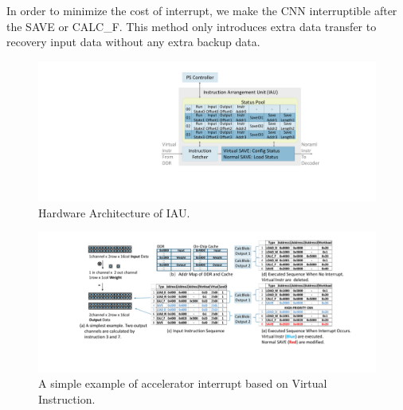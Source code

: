 In order to minimize the cost of interrupt, we make the CNN interruptible after the SAVE or CALC\_F. This method only introduces extra data transfer to recovery input data without any extra backup data.





\begin{figure}[t]
	\centering
    \vspace{-0.1cm} 
    \setlength{\abovecaptionskip}{0cm} 
    \setlength{\belowcaptionskip}{-0.05cm} 
	\includegraphics[width=0.99\linewidth]{fig/iau.pdf}
	\caption{Hardware Architecture of IAU. 
	}
	\label{fig:IAU}
\end{figure}
\begin{figure}[t]
	\centering
    \vspace{-0.1cm} 
    \setlength{\abovecaptionskip}{0cm} 
    \setlength{\belowcaptionskip}{-0.05cm} 
	\includegraphics[width=0.90\linewidth]{fig/interexample.pdf}
	\caption{ A simple example of accelerator interrupt based on Virtual Instruction. }
	\label{fig:interexample}
\end{figure}



